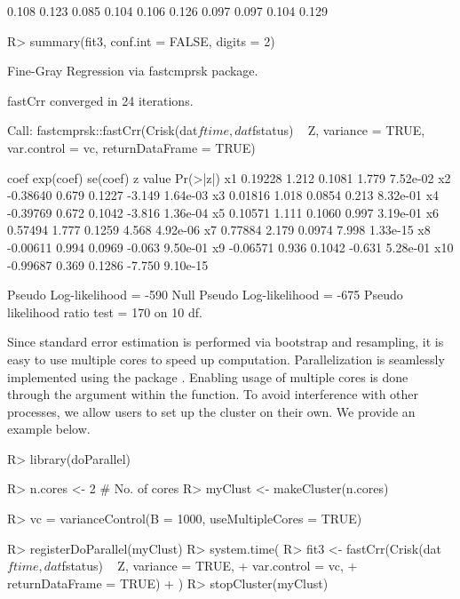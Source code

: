 \begin{example}
 [1] 0.108 0.123 0.085 0.104 0.106 0.126 0.097 0.097 0.104 0.129
\end{example}
\begin{example}
R> summary(fit3, conf.int = FALSE, digits = 2)
\end{example}
\begin{example}
Fine-Gray Regression via fastcmprsk package. 

fastCrr converged in 24 iterations.
 
Call:
fastcmprsk::fastCrr(Crisk(dat$ftime, dat$fstatus) ~ Z, variance = TRUE, 
    var.control = vc, returnDataFrame = TRUE)

        coef exp(coef) se(coef) z value Pr(>|z|)
x1   0.19228     1.212   0.1081   1.779 7.52e-02
x2  -0.38640     0.679   0.1227  -3.149 1.64e-03
x3   0.01816     1.018   0.0854   0.213 8.32e-01
x4  -0.39769     0.672   0.1042  -3.816 1.36e-04
x5   0.10571     1.111   0.1060   0.997 3.19e-01
x6   0.57494     1.777   0.1259   4.568 4.92e-06
x7   0.77884     2.179   0.0974   7.998 1.33e-15
x8  -0.00611     0.994   0.0969  -0.063 9.50e-01
x9  -0.06571     0.936   0.1042  -0.631 5.28e-01
x10 -0.99687     0.369   0.1286  -7.750 9.10e-15

Pseudo Log-likelihood = -590 
Null Pseudo Log-likelihood = -675 
Pseudo likelihood ratio test = 170 on 10 df. 
\end{example}

{\color{blue}
Since standard error estimation is performed via bootstrap and resampling, it is easy to use multiple cores to speed up computation. Parallelization is seamlessly implemented using the  package \citep{doParallel}. Enabling usage of multiple cores is done through the  argument within the  function. To avoid interference with other processes, we allow users to set up the cluster on their own. We provide an example below.

\begin{example}
R> library(doParallel) 

R> n.cores <- 2 # No. of cores
R> myClust <- makeCluster(n.cores)

R> vc = varianceControl(B = 1000, useMultipleCores = TRUE)

R> registerDoParallel(myClust)
R> system.time(
R> fit3 <- fastCrr(Crisk(dat$ftime, dat$fstatus) ~ Z, variance = TRUE,
+                             var.control = vc,
+                             returnDataFrame = TRUE)
+ )
R> stopCluster(myClust)
\end{example}
}


